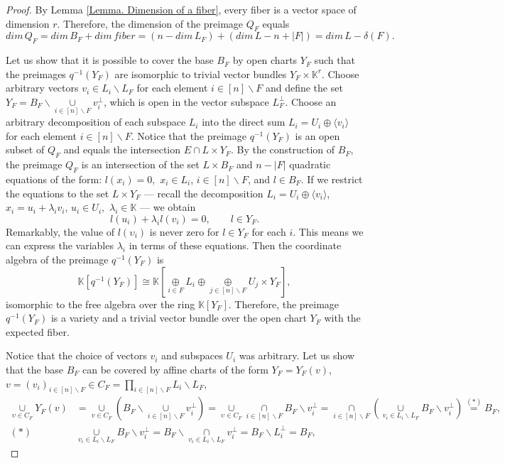 \documentclass[11pt]{article}
\theoremstyle{plain}
\theoremstyle{definition}
\theoremstyle{remark}
\theoremstyle{plain}
\theoremstyle{plain}
\theoremstyle{plain}
\theoremstyle{definition}
\begin{document}
\begin{proof}
By Lemma \ref{Lemma. Dimension of a fiber}, every fiber is a vector
space of dimension $r$. Therefore, the dimension of the preimage
$Q_{F}$ equals 
\[
dim\,Q_{F}=dim\,B_{F}+dim\,fiber=(n-dim\,L_{F})+(dim\,L-n+|F|)=dim\,L-\delta(F).
\]

Let us show that it is possible to cover the base $B_{F}$ by open
charts $Y_{F}$ such that the preimages $q^{-1}(Y_{F})$ are isomorphic
to trivial vector bundles $Y_{F}\times\mathbb{K}^{r}$. Choose arbitrary
vectors $v_{i}\in L_{i}\backslash L_{F}$ for each element $i\in[n]\backslash F$
and define the set $Y_{F}=B_{F}\backslash\underset{i\in[n]\backslash F}{\cup}v_{i}^{\perp}$,
which is open in the vector subspace $L_{F}^{\perp}$. Choose an arbitrary
decomposition of each subspace $L_{i}$ into the direct sum $L_{i}=U_{i}\oplus\langle v_{i}\rangle$
for each element $i\in[n]\backslash F$. Notice that the preimage
$q^{-1}(Y_{F})$ is an open subset of $Q_{F}$ and equals the intersection
$E\cap L\times Y_{F}$. By the construction of $B_{F},$ the preimage
$Q_{F}$ is an intersection of the set $L\times B_{F}$ and $n-|F|$
quadratic equations of the form: $l(x_{i})=0,$ $x_{i}\in L_{i}$,
$i\in[n]\backslash F$, and $l\in B_{F}$. If we restrict the equations
to the set $L\times Y_{F}$ --- recall the decomposition $L_{i}=U_{i}\oplus\langle v_{i}\rangle$,
$x_{i}=u_{i}+\lambda_{i}v_{i}$, $u_{i}\in U_{i},$ $\lambda_{i}\in\mathbb{K}$
--- we obtain
\[
l(u_{i})+\lambda_{i}l(v_{i})=0,\qquad l\in Y_{F}.
\]
Remarkably, the value of $l(\upsilon_{i})$ is never zero for $l\in Y_{F}$
for each $i$. This means we can express the variables $\lambda_{i}$
in terms of these equations. Then the coordinate algebra of the preimage
$q^{-1}(Y_{F})$ is 
\[
\mathbb{K}[q^{-1}(Y_{F})]\cong\mathbb{K}[\underset{i\in F}{\oplus}L_{i}\oplus\underset{j\in[n]\backslash F}{\oplus}U_{j}\times Y_{F}],
\]
isomorphic to the free algebra over the ring $\mathbb{K}[Y_{F}]$.
Therefore, the preimage $q^{-1}(Y_{F})$ is a variety and a trivial
vector bundle over the open chart $Y_{F}$ with the expected fiber.

Notice that the choice of vectors $v_{i}$ and subspaces $U_{i}$
was arbitrary. Let us show that the base $B_{F}$ can be covered by
affine charts of the form $Y_{F}=Y_{F}(v)$, $v=(v_{i})_{i\in[n]\backslash F}\in C_{F}=\underset{i\in[n]\backslash F}{\prod}L_{i}\backslash L_{F}$,
\begin{align*}
\underset{\upsilon\in C_{F}}{\cup}Y_{F}(v) & =\underset{v\in C_{F}}{\cup}(B_{F}\backslash\underset{i\in[n]\backslash F}{\cup}v_{i}^{\perp})=\underset{\upsilon\in C_{F}}{\cup}\underset{i\in[n]\backslash F}{\cap}B_{F}\backslash v_{i}^{\perp}=\underset{i\in[n]\backslash F}{\cap}(\underset{v_{i}\in L_{i}\backslash L_{F}}{\cup}B_{F}\backslash v_{i}^{\perp})\overset{(*)}{=}B_{F},\\
(*) & \underset{v_{i}\in L_{i}\backslash L_{F}}{\cup}B_{F}\backslash v_{i}^{\perp}=B_{F}\backslash\underset{v_{i}\in L_{i}\backslash L_{F}}{\cap}v_{i}^{\perp}=B_{F}\backslash L_{i}^{\perp}=B_{F},
\end{align*}
\end{proof}
\end{document}
